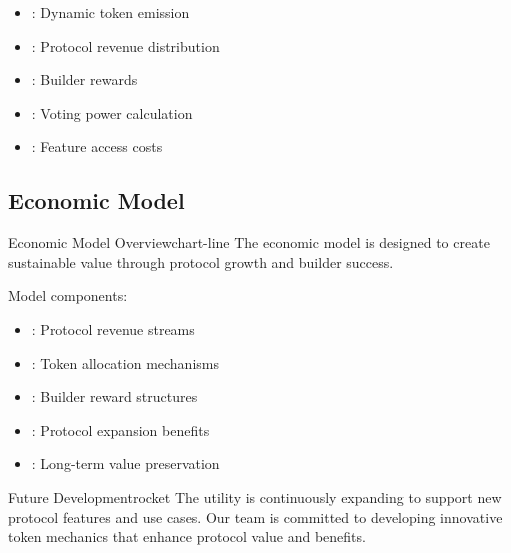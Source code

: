 \begin{itemize}[leftmargin=*]
\item {}: Dynamic token emission
\item {}: Protocol revenue distribution
\item {}: Builder rewards
\item {}: Voting power calculation
\item {}: Feature access costs
\end{itemize}

\subsection{Economic Model}

\begin{mfai-box-prove}{Economic Model Overview}{chart-line}
The  economic model is designed to create sustainable value through protocol growth and builder success.
\end{mfai-box-prove}

Model components:

\begin{itemize}[leftmargin=*]
\item {}: Protocol revenue streams
\item {}: Token allocation mechanisms
\item {}: Builder reward structures
\item {}: Protocol expansion benefits
\item {}: Long-term value preservation
\end{itemize}

\begin{center}
\end{center}

\begin{mfai-box-scale}{Future Development}{rocket}
The  utility is continuously expanding to support new protocol features and use cases. Our team is committed to developing innovative token mechanics that enhance protocol value and  benefits.
\end{mfai-box-scale}

\newpage 